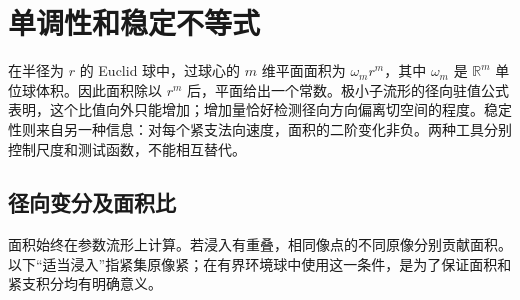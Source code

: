 
% 
% 

\section{单调性和稳定不等式}
\label{g3:sec:1903}

在半径为 \(r\) 的 Euclid 球中，过球心的 \(m\) 维平面面积为 \(\omega_m r^m\)，其中 \(\omega_m\) 是 \(\mathbb R^m\) 单位球体积。因此面积除以 \(r^m\) 后，平面给出一个常数。极小子流形的径向驻值公式表明，这个比值向外只能增加；增加量恰好检测径向方向偏离切空间的程度。稳定性则来自另一种信息：对每个紧支法向速度，面积的二阶变化非负。两种工具分别控制尺度和测试函数，不能相互替代。

\subsection{径向变分及面积比}
\label{g3:subsec:1903:01}
面积始终在参数流形上计算。若浸入有重叠，相同像点的不同原像分别贡献面积。以下“适当浸入”指紧集原像紧；在有界环境球中使用这一条件，是为了保证面积和紧支积分均有明确意义。

